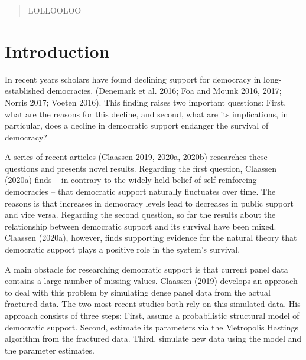 \documentclass[12pt,english,a4paper,oneside]{article}
\theoremstyle{definition}
\theoremstyle{definition}
\theoremstyle{definition}
\theoremstyle{definition}
\theoremstyle{remark}
\begin{document}
\newpage







{
\setcounter{tocdepth}{2}
\newpage
{}
\tableofcontents
}

\newpage
{}
\pagestyle{plain}
\begin{abstract}
LOLLOOLOO
\end{abstract}

\hypertarget{introduction}{%
\section{Introduction}\label{introduction}}

In recent years scholars have found declining support for democracy in long-established democracies. (Denemark et al. 2016; Foa and Mounk 2016, 2017; Norris 2017; Voeten 2016). This finding raises two important questions: First, what are the reasons for this decline, and second, what are its implications, in particular, does a decline in democratic support endanger the survival of democracy?

A series of recent articles (Claassen 2019, 2020a, 2020b) researches these questions and presents novel results. Regarding the first question, Claassen (2020a) finds -- in contrary to the widely held belief of self-reinforcing democracies -- that democratic support naturally fluctuates over time. The reasons is that increases in democracy levels lead to decreases in public support and vice versa. Regarding the second question, so far the results about the relationship between democratic support and its survival have been mixed. Claassen (2020a), however, finds supporting evidence for the natural theory that democratic support plays a positive role in the system's survival.

A main obstacle for researching democratic support is that current panel data contains a large number of missing values. Claassen (2019) develops an approach to deal with this problem by simulating dense panel data from the actual fractured data. The two most recent studies both rely on this simulated data. His approach consists of three steps: First, assume a probabilistic structural model of democratic support. Second, estimate its parameters via the Metropolis Hastings algorithm from the fractured data. Third, simulate new data using the model and the parameter estimates.
\end{document}
